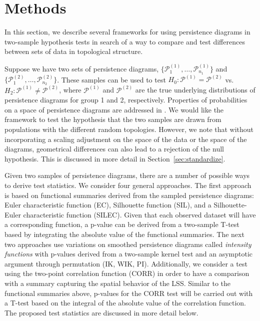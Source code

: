 \documentclass[12pt]{article}
\begin{document}

\section{Methods}
\label{sec:methods}
In this section, we describe several frameworks for using persistence diagrams in two-sample hypothesis tests in search of a way to compare and test differences between sets of data in topological structure.  

\begin{sloppypar}
Suppose we have two sets of persistence diagrams, $\{\mathcal P_1^{(1)}, \ldots, \mathcal P_{n_1}^{(1)}\}$ and $\{\mathcal P_1^{(2)}, \ldots, \mathcal P_{n_2}^{(2)}\}$.  These samples can be used to test $H_0: \mathcal 
P^{(1)} = \mathcal P^{(2)}$ vs. $H_2: \mathcal P^{(1)} \neq \mathcal P^{(2)}$, where $\mathcal P^{(1)}$ and $\mathcal P^{(2)}$ are the true underlying 
distributions of persistence diagrams for group 1 and 2, respectively.  Properties of probabilities on a space of persistence diagrams are addressed in \citep{Mileyko:2011aa}. 
We would like the framework to test the hypothesis that the two samples are drawn from populations with the different random topologies. However, we note that without incorporating a scaling adjustment on the space of the data or the space of the diagrams, geometrical differences can also lead to a rejection of the null hypothesis. This is discussed in more detail in Section~\ref{sec:standardize}. 
\end{sloppypar}

Given two samples of persistence diagrams, there are a number of possible ways to derive test statistics. We consider four general approaches. The first approach is based on functional summaries derived from the sampled persistence diagrams: Euler characteristic function (EC), Silhouette function (SIL), and a 
Silhouette-Euler characteristic function (SILEC). Given that each observed dataset will have a corresponding function, a p-value can be derived from 
a two-sample T-test based by integrating the absolute value of the functional summaries. The next two approaches use variations on smoothed persistence diagrams called \emph{intensity functions} \citep{chen2015statistical} with p-values derived from a two-sample kernel test \citep{gretton2012kernel} and an asymptotic argument through permutation (IK, WIK, PI). Additionally, we consider a test using the two-point correlation function (CORR) in order to have a comparison with a summary capturing the spatial behavior of the LSS. Similar to the functional summaries above, p-values for the CORR test will be carried out with a T-test based on the integral of the absolute value of the correlation function. The proposed test statistics are discussed in more detail below.
\end{document}
